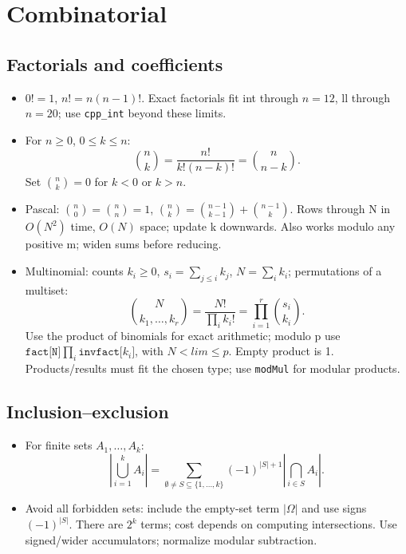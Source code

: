 \chapter{Combinatorial}

\section{Factorials and coefficients}
\begin{itemize}[nosep,leftmargin=*]
\item $0!=1$, $n!=n(n-1)!$. Exact factorials fit int through
$n=12$, ll through $n=20$; use \texttt{cpp\_int} beyond these limits.
\item For $n\ge0$, $0\le k\le n$:
\[
 \binom nk=\frac{n!}{k!(n-k)!}=\binom n{n-k}.
\]
Set $\binom nk=0$ for $k<0$ or $k>n$.
\end{itemize}
\begin{itemize}[nosep,leftmargin=*]
\item Pascal: $\binom n0=\binom nn=1$,
$\binom nk=\binom{n-1}{k-1}+\binom{n-1}k$.
Rows through N in $O(N^2)$ time, $O(N)$ space;
update k downwards. Also works modulo any positive m;
widen sums before reducing.
\item Multinomial: counts $k_i\ge0$, $s_i=\sum_{j\le i}k_j$,
$N=\sum_i k_i$; permutations of a multiset:
\[
 \binom{N}{k_1,\ldots,k_r}
 =\frac{N!}{\prod_i k_i!}
 =\prod_{i=1}^r\binom{s_i}{k_i}.
\]
Use the product of binomials for exact arithmetic;
modulo p use $\texttt{fact[N]}\prod_i\texttt{invfact[}k_i\texttt{]}$, with $N<lim\le p$.
Empty product is 1. Products/results must fit the chosen type;
use \texttt{modMul} for modular products.
\end{itemize}

\section{Inclusion--exclusion}
\begin{itemize}[nosep,leftmargin=*]
\item For finite sets $A_1,\ldots,A_k$:
\[
 \left|\bigcup_{i=1}^k A_i\right|
 =\sum_{\emptyset\ne S\subseteq\{1,\ldots,k\}}
 (-1)^{|S|+1}\left|\bigcap_{i\in S}A_i\right|.
\]
\item Avoid all forbidden sets: include the empty-set term
$|\Omega|$ and use signs $(-1)^{|S|}$.
There are $2^k$ terms; cost depends on computing intersections.
Use signed/wider accumulators; normalize modular subtraction.
\end{itemize}

